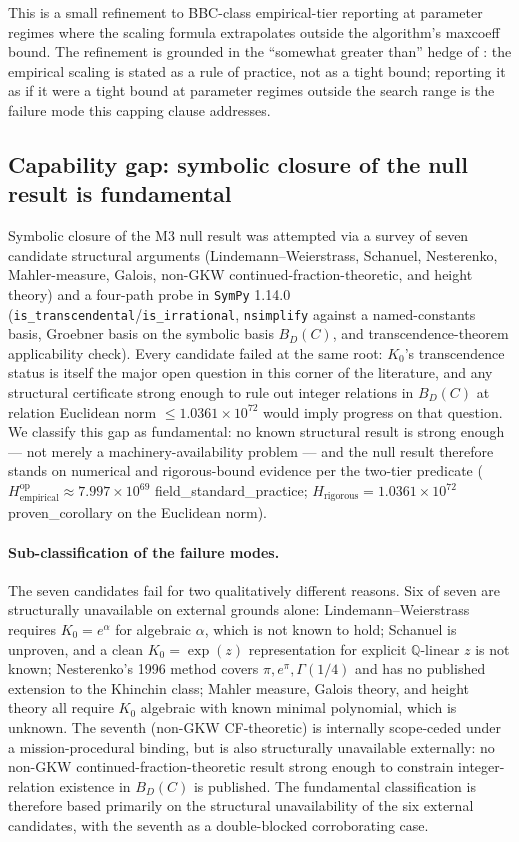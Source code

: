 \documentclass[11pt,a4paper]{article}
\newcommand{\K}{K_{0}}
\newcommand{\Hrig}{H_{\mathrm{rigorous}}}
\newcommand{\Hempop}{H_{\mathrm{empirical}}^{\mathrm{op}}}
\newcommand{\BDC}{B_{D}(C)}
\newcommand{\fsp}{\textsf{field\_standard\_practice}}
\newcommand{\pc}{\textsf{proven\_corollary}}
\begin{document}
This is a small refinement to BBC-class empirical-tier reporting at
parameter regimes where the scaling formula extrapolates outside the
algorithm's \textsf{maxcoeff} bound.
The refinement is grounded in the ``somewhat greater than''
hedge of \cite[\S 2]{bailey1998}: the empirical scaling is stated as a rule
of practice, not as a tight bound; reporting it as if it were a tight bound
at parameter regimes outside the search range is the failure mode this
capping clause addresses.

\subsection{Capability gap: symbolic closure of the null result is
   fundamental}\label{sec:m4-gap}

Symbolic closure of the M3 null result was attempted via a survey of seven
candidate structural arguments
(Lindemann--Weierstrass, Schanuel, Nesterenko, Mahler-measure, Galois,
non-GKW continued-fraction-theoretic, and height theory)
and a four-path probe in \texttt{SymPy} 1.14.0
(\texttt{is\_transcendental}/\texttt{is\_irrational}, \texttt{nsimplify}
against a named-constants basis, Groebner basis on the symbolic basis $\BDC$,
and transcendence-theorem applicability check).
Every candidate failed at the same root: $\K$'s transcendence status is
itself the major open question in this corner of the literature, and any
structural certificate strong enough to rule out integer relations in
$\BDC$ at relation Euclidean norm
$\le 1.0361\times 10^{72}$ would imply progress on that
question.
We classify this gap as fundamental: no known structural result is strong
enough --- not merely a machinery-availability problem --- and the null
result therefore stands on numerical and rigorous-bound evidence per the
two-tier predicate
($\Hempop \approx 7.997\times 10^{69}$ \fsp{};
$\Hrig = 1.0361\times 10^{72}$ \pc{} on the Euclidean norm).

\paragraph{Sub-classification of the failure modes.}
The seven candidates fail for two qualitatively different reasons.
Six of seven are structurally unavailable on external grounds alone:
Lindemann--Weierstrass requires $\K = e^{\alpha}$ for algebraic $\alpha$,
which is not known to hold; Schanuel is unproven, and a clean
$\K = \exp(z)$ representation for explicit $\mathbb{Q}$-linear $z$ is not
known; Nesterenko's 1996 method covers $\pi, e^{\pi}, \Gamma(1/4)$ and has
no published extension to the Khinchin class; Mahler measure, Galois
theory, and height theory all require $\K$ algebraic with known minimal
polynomial, which is unknown.
The seventh (non-GKW CF-theoretic) is internally scope-ceded under a
mission-procedural binding, but is also structurally unavailable externally:
no non-GKW continued-fraction-theoretic result strong enough to constrain
integer-relation existence in $\BDC$ is published.
The fundamental classification is therefore based primarily on the
structural unavailability of the six external candidates, with the
seventh as a double-blocked corroborating case.
\end{document}
